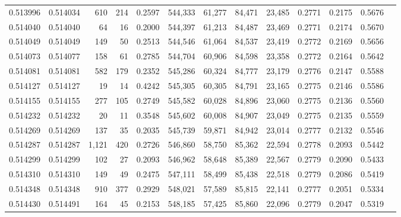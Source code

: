 \begin{tabular}{rrrrrrrrrrrrr}
0.513996 & 0.514034 &   610 &   214 &                                     0.2597 & 544,333 &  61,277 &  84,471 &  23,485 & 0.2771 & 0.2175 & 0.5676 \\
0.514040 & 0.514040 &    64 &    16 &                                     0.2000 & 544,397 &  61,213 &  84,487 &  23,469 & 0.2771 & 0.2174 & 0.5670 \\
0.514049 & 0.514049 &   149 &    50 &                                     0.2513 & 544,546 &  61,064 &  84,537 &  23,419 & 0.2772 & 0.2169 & 0.5656 \\
0.514073 & 0.514077 &   158 &    61 &                                     0.2785 & 544,704 &  60,906 &  84,598 &  23,358 & 0.2772 & 0.2164 & 0.5642 \\
0.514081 & 0.514081 &   582 &   179 &                                     0.2352 & 545,286 &  60,324 &  84,777 &  23,179 & 0.2776 & 0.2147 & 0.5588 \\
0.514127 & 0.514127 &    19 &    14 &                                     0.4242 & 545,305 &  60,305 &  84,791 &  23,165 & 0.2775 & 0.2146 & 0.5586 \\
0.514155 & 0.514155 &   277 &   105 &                                     0.2749 & 545,582 &  60,028 &  84,896 &  23,060 & 0.2775 & 0.2136 & 0.5560 \\
0.514232 & 0.514232 &    20 &    11 &                                     0.3548 & 545,602 &  60,008 &  84,907 &  23,049 & 0.2775 & 0.2135 & 0.5559 \\
0.514269 & 0.514269 &   137 &    35 &                                     0.2035 & 545,739 &  59,871 &  84,942 &  23,014 & 0.2777 & 0.2132 & 0.5546 \\
0.514287 & 0.514287 & 1,121 &   420 &                                     0.2726 & 546,860 &  58,750 &  85,362 &  22,594 & 0.2778 & 0.2093 & 0.5442 \\
0.514299 & 0.514299 &   102 &    27 &                                     0.2093 & 546,962 &  58,648 &  85,389 &  22,567 & 0.2779 & 0.2090 & 0.5433 \\
0.514310 & 0.514310 &   149 &    49 &                                     0.2475 & 547,111 &  58,499 &  85,438 &  22,518 & 0.2779 & 0.2086 & 0.5419 \\
0.514348 & 0.514348 &   910 &   377 &                                     0.2929 & 548,021 &  57,589 &  85,815 &  22,141 & 0.2777 & 0.2051 & 0.5334 \\
0.514430 & 0.514491 &   164 &    45 &                                     0.2153 & 548,185 &  57,425 &  85,860 &  22,096 & 0.2779 & 0.2047 & 0.5319 \\

\end{tabular}
